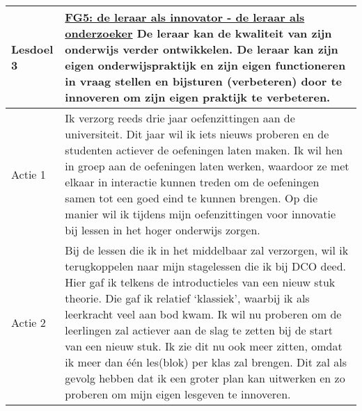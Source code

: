 \vspace{0.5cm}
\begin{tabularx}{\textwidth}{|p{}|p{}|}
	\hline
	\textbf{Lesdoel 3} & \underline{FG5:  de leraar als innovator - de leraar als onderzoeker}\newline\newline
	5.1 De leraar kan de kwaliteit van zijn onderwijs verder ontwikkelen. De leraar kan zijn eigen onderwijspraktijk en zijn eigen functioneren in vraag stellen en bijsturen (verbeteren) door te innoveren om zijn eigen praktijk te verbeteren.\\ \hline
	Actie 1 & Ik verzorg reeds drie jaar oefenzittingen aan de universiteit. Dit jaar wil ik iets nieuws proberen en de studenten actiever de oefeningen laten maken. Ik wil hen in groep aan de oefeningen laten werken, waardoor ze met elkaar in interactie kunnen treden om de oefeningen samen tot een goed eind te kunnen brengen. Op die manier wil ik tijdens mijn oefenzittingen voor innovatie bij lessen in het hoger onderwijs zorgen. \\ \hline
	Actie 2 & Bij de lessen die ik in het middelbaar zal verzorgen, wil ik terugkoppelen naar mijn stagelessen die ik bij DCO deed. Hier gaf ik telkens de introductieles van een nieuw stuk theorie. Die gaf ik relatief `klassiek', waarbij ik als leerkracht veel aan bod kwam. Ik wil nu proberen om de leerlingen zal actiever aan de slag te zetten bij de start van een nieuw stuk. Ik zie dit nu ook meer zitten, omdat ik meer dan één les(blok) per klas zal brengen. Dit zal als gevolg hebben dat ik een groter plan kan uitwerken en zo proberen om mijn eigen lesgeven te innoveren.    \\ \hline
\end{tabularx}